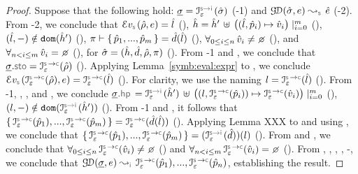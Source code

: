 \begin{proof}
Suppose that the following hold: 
$\istate = \interpret{\symbinst}{\senv}(\sstate)$ (\hyp{1}) and $\absgetdomainrule{\symbolic}{\sstate, \jsilexpr}{\sexpr}$ (\hyp{2}). 
From \hyp{2}, we conclude that 
$\evalexpr{\symbolic}(\sstore, \jsilexpr) = \sloc$ (), 
$\hat{h} = \hat{h}' \, \uplus \, \big((\hat{l}, \hat{p}_i) \mapsto \hat{v}_i \big)\mid_{i = 0}^m$ (), 
$(\hat{l},-) \notin \texttt{dom} (\hat{h}')$ (), 
$\pi \vdash \{ \, \hat{p}_1, ..., \hat{p}_m \, \} = \hat{d}(\hat{l})$ (), 
$\forall_{0 \leq i \leq n} \, \sexprv_i \neq \none$ (), 
and $\forall_{n < i \leq m} \, \sexprv_i = \none$ (), for $\hat{\sigma} = (\hat{h}, \hat{d}, \hat\rho, \pi)$ (). 
From \hyp{1} and , we conclude that $\istate.\stosel = \interpret{\symbconc}{\senv}(\sstore)$ (). 
 Applying Lemma~\ref{symb:eval:expr} to , we conclude 
 $\evalexpr{\symbolic}(\interpret{\symbconc}{\senv}(\sstore), \jsilexpr) = \interpret{\symbconc}{\senv}(\sloc)$ (). 
 For clarity, we use the naming $\loc = \interpret{\symbconc}{\senv}(\sloc)$ (). 
 From \hyp{1}, , , and , we conclude 
 $\istate.\hpsel =  \interpret{\symbinst}{\senv}(\sheap') \, \uplus \, \big((\loc, \interpret{\symbconc}{\senv}(\sexprp_i)) \mapsto \interpret{\symbconc}{\senv}(\sexprv_i) \big)\mid_{i = 0}^m$ (), 
$(\loc,-) \notin \domain (\interpret{\symbinst}{\senv}(\sheap'))$ ().
From \hyp{1} and , it follows that $\jsilset{\interpret{\symbconc}{\senv}(\sexprp_1), ..., \interpret{\symbconc}{\senv}(\sexprp_m)} = \interpret{\symbconc}{\senv}(\sdom(\sloc))$ ().
Applying Lemma XXX to  and using , we conclude that 
 $\jsilset{\interpret{\symbconc}{\senv}(\sexprp_1), ..., \interpret{\symbconc}{\senv}(\sexprp_m)} = (\interpret{\symbinst}{\senv}(\sdom))(\loc)$ (). 
 From  and , we conclude that 
 {\small $\forall_{0 \leq i \leq n} \, \interpret{\symbconc}{\senv}(\sexprv_i) \neq \none$} () and  
{\small $\forall_{n < i \leq m} \, \interpret{\symbconc}{\senv}(\sexprv_i) = \none$} ().
From , , , , -, we conclude that 
$\absgetdomainrule{\instrumented}{\istate, \jsilexpr}{\interpret{\symbconc}{\senv}(\sexprp_1), ..., \interpret{\symbconc}{\senv}(\sexprp_n)}$, 
establishing the result. 
\end{proof}


